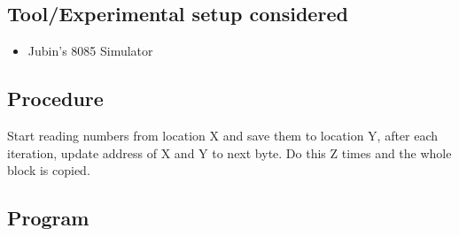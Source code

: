 \documentclass[a4paper]{article} %
\begin{document}
\subsection{Tool/Experimental setup considered}
\begin{itemize}
    \item Jubin's 8085 Simulator
\end{itemize}
\subsection{Procedure}
Start reading numbers from location X and save them to location Y, after each iteration, update address of X and Y to next byte. Do this Z times and the whole block is copied.
\subsection{Program}

\newpage
\end{document}
